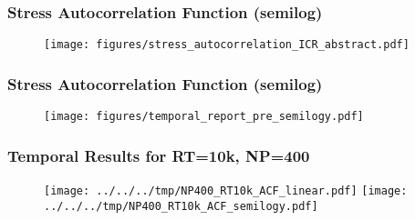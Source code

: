 \documentclass[slidestop, compress, mathserif]{beamer}
\begin{document}
\begin{frame}
  \frametitle<presentation>{Stress Autocorrelation Function (semilog)}
  \begin{figure}
    \centering
    \texttt{[image: figures/stress\_autocorrelation\_ICR\_abstract.pdf]}
  \end{figure}
\end{frame}

\begin{frame}
  \frametitle<presentation>{Stress Autocorrelation Function (semilog)}
  \begin{figure}
    \centering
    \texttt{[image: figures/temporal\_report\_pre\_semilogy.pdf]}
  \end{figure}
\end{frame}

\begin{frame}
  \frametitle<presentation>{Temporal Results for RT=10k, NP=400}
  \begin{figure}
    \centering
    \texttt{[image: ../../../tmp/NP400\_RT10k\_ACF\_linear.pdf]}
    \texttt{[image: ../../../tmp/NP400\_RT10k\_ACF\_semilogy.pdf]}
  \end{figure}
\end{frame}





\end{document}
